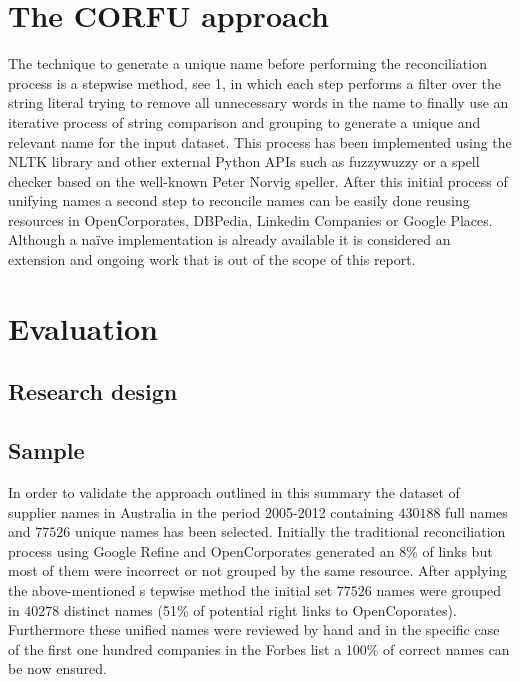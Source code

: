 \documentclass{llncs}
\begin{document}
 \section{The CORFU approach}
 
The technique to generate a unique name before performing the reconciliation process is a stepwise method, see 1, in which each step performs a filter over 
the string literal trying to remove all unnecessary words in the name to finally use an iterative process of string comparison and grouping to generate a unique 
and relevant name for the input dataset. This process has been implemented using the NLTK library and other external Python APIs such as fuzzywuzzy or a spell 
checker based on the well-known Peter Norvig speller. After this initial process of unifying names a second step to reconcile names can be easily done reusing 
resources in OpenCorporates, DBPedia, Linkedin Companies or Google Places. Although a naïve implementation is already available it is considered an 
extension and ongoing work that is out of the scope of this report.  
% 
\section{Evaluation}

\subsection{Research design}
% 
\subsection{Sample}
In order to validate the approach outlined in this summary the dataset of supplier names in Australia in the period 2005-2012 containing $430188$ full names 
and $77526$ unique names has been selected. Initially the traditional reconciliation process using 
Google Refine and OpenCorporates generated an 8\% of links but most of them were 
incorrect or not grouped by the same resource. After applying the above-mentioned s
tepwise method the initial set $77526$ names were grouped in $40278$ 
distinct names (51\% of potential right links to OpenCoporates). 
Furthermore these unified names were reviewed by hand and in the specific case 
of the first one hundred companies in the Forbes list a 100\% of correct names can be now ensured.
 
\end{document}
